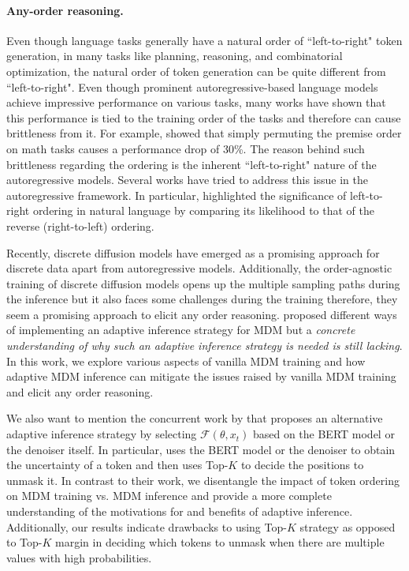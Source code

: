 \paragraph{Any-order reasoning.} Even though language tasks generally have a natural order of ``left-to-right" token generation, in many tasks like planning, reasoning, and combinatorial optimization, the natural order of token generation can be quite different from ``left-to-right". Even though prominent autoregressive-based language models achieve impressive performance on various tasks, many works \cite{golovneva2024reverse, chen2024premise, kitouni2024factorization} have shown that this performance is tied to the training order of the tasks and therefore can cause brittleness from it. For example, \citet{chen2024premise} showed that simply permuting the premise order on math tasks causes a performance drop of 30\%. The reason behind such brittleness regarding the ordering is the inherent ``left-to-right" nature of the autoregressive models. Several works \cite{liao-etal-2020-probabilistically} have tried to address this issue in the autoregressive framework. In particular, \cite{papadopoulos2024arrows} highlighted the significance of left-to-right ordering in natural language by comparing its likelihood to that of the reverse (right-to-left) ordering.

Recently, discrete diffusion models have emerged as a promising approach for discrete data apart from autoregressive models. Additionally, the order-agnostic training of discrete diffusion models opens up the multiple sampling paths during the inference but it also faces some challenges during the training therefore, they seem a promising approach to elicit any order reasoning. \citet{zheng2024reparameterized} proposed different ways of implementing an adaptive inference strategy for MDM but a \emph{concrete understanding of why such an adaptive inference strategy is needed is still lacking}. In this work, we explore various aspects of vanilla MDM training and how adaptive MDM inference can mitigate the issues raised by vanilla MDM training and elicit any order reasoning. 

We also want to mention the concurrent work by \citet{peng2025path} that proposes an alternative adaptive inference strategy by selecting $\mathcal F(\theta, x_t)$ based on the BERT model or the denoiser itself. In particular, \citet{peng2025path} uses the BERT model or the denoiser to obtain the uncertainty of a token and then uses Top-$K$ to decide the positions to unmask it. In contrast to their work, we disentangle the impact of token ordering on MDM training vs. MDM inference and provide a more complete understanding of the motivations for and benefits of adaptive inference. Additionally, our results indicate drawbacks to using Top-$K$ strategy as opposed to Top-$K$ margin in deciding which tokens to unmask when there are multiple values with high probabilities.

